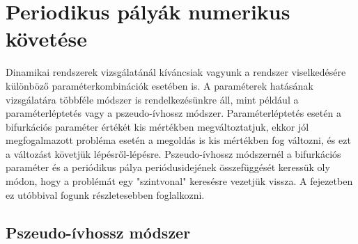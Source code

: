 
\chapter{\label{sec:perpalyakovetes}Periodikus pályák numerikus követése}

Dinamikai rendszerek vizsgálatánál kíváncsiak vagyunk a rendszer viselkedésére különböző paraméterkombinációk esetében is.
A paraméterek ha\-tá\-sá\-nak vizsgálatára többféle módszer is rendelkezésünkre áll, mint például a paraméterléptetés vagy a pszeudo-ívhossz módszer.
Paraméterléptetés esetén a bifurkációs paraméter értékét kis mértékben megváltoztatjuk, ekkor jól megfogalmazott probléma esetén a megoldás is kis mértékben fog változni, és ezt a változást követjük lépésről-lépésre.
Pszeudo-ívhossz mód\-szer\-nél a bifurkációs paraméter és a periódikus pálya periódusidejének össze\-füg\-gé\-sét keressük oly módon, hogy a problémát egy "szintvonal" keresésre vezetjük vissza.
A fejezetben ez utóbbival fogunk részletesebben foglalkozni.

\section{Pszeudo-ívhossz módszer}
\label{sec:pseudo_ivhossz}

